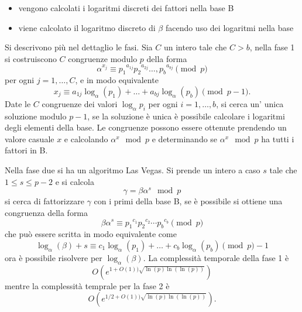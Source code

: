 \begin{itemize}
    \item vengono calcolati i logaritmi discreti dei fattori nella base B
    \item viene calcolato il logaritmo discreto di $\beta$ facendo uso dei logaritmi nella base
\end{itemize}
Si descrivono più nel dettaglio le fasi. Sia $C$ un intero tale che $C > b$, nella fase 1 si costruiscono $C$ congruenze modulo $p$ della forma
\[
    \alpha^{x_j} \equiv {p_1}^{a_{1j}} {p_2}^{a_{2j}}\dots,{p_b}^{a_{bj}} \pmod p
\]
per ogni $j = 1,\dots, C$, e in modo equivalente
\[
    x_j \equiv a_{1j}\log_{\alpha}(p_1) + \dots + a_{bj}\log_{\alpha}(p_b) \pmod {p-1}.
\]
Date le $C$ congruenze dei valori $\log_{\alpha}p_i$ per ogni $i = 1,\dots,b$, si cerca un' unica soluzione modulo $p-1$, se la soluzione è unica è possibile calcolare i logaritmi degli elementi della base. Le congruenze possono essere ottenute prendendo un valore casuale $x$ e calcolando $\alpha^{x} \mod p$ e determinando se $\alpha^x \mod p$ ha tutti i fattori in B. 

\vspace{1em}
Nella fase due si ha un algoritmo Las Vegas. Si prende un intero a caso $s$ tale che $1 \leq s \leq p-2$ e si calcola
\[
    \gamma = \beta \alpha^s \mod p
\]
si cerca di fattorizzare $\gamma$ con i primi della base B, se è possibile si ottiene una congruenza della forma 
\[
    \beta \alpha^s \equiv {p_1}^{c_1} {p_2}^{c_2} \cdots {p_b}^{c_b} \pmod p
\]
che può essere scritta in modo equivalente come 
\[
    \log_{\alpha}(\beta) + s \equiv c_1 \log_{\alpha}(p_1)+ \dots + {c_b}\log_{\alpha}(p_b) \pmod p-1
\]
ora è possibile risolvere per $\log_{\alpha}(\beta)$. La complessità temporale della fase 1 è 
\[
    O\left(e^{1 + O(1)) \sqrt{\ln( p )\ln( \ln( p))}}\right)
\]
mentre la complessità temprale per la fase 2 è 
\[
    O\left(e^{1/2 + O(1)) \sqrt{\ln( p )\ln( \ln( p))}}\right).
\]

